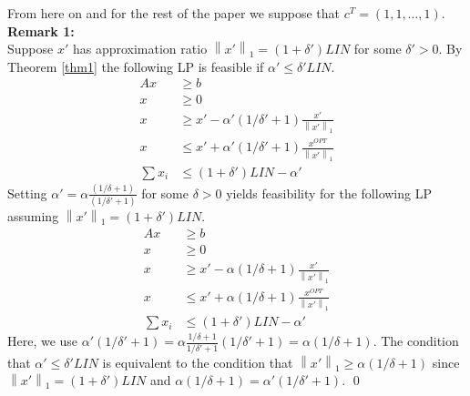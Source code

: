 \documentclass[a4paper,11pt]{article}
\newcommand{\nor}[1]{\left\|#1\right\|}
\begin{document}
From here on and for the rest of the paper we suppose that $c^T = (1,1, \ldots ,1)$.\\
{\bf Remark 1:\\}
Suppose $x'$ has approximation ratio $\nor{x'}_1 = (1+\delta') \mathit{LIN}$ for some $\delta' > 0$.
By Theorem \ref{thm1} the following LP is feasible if $\alpha' \leq \delta' \mathit{LIN}$.
\begin{align*}
      Ax &\geq b\\
      x &\geq 0\\
      x &\geq x' - \alpha'(1/\delta' +1) \frac{x'}{\nor{x'}_1}\\
      x &\leq x' + \alpha'(1/\delta' +1) \frac{x^{\mathit{OPT}}}{\nor{x'}_1}\\
      \sum x_i &\leq (1+ \delta') \mathit{LIN} - \alpha'
\end{align*}
Setting $\alpha' = \alpha \frac{(1/\delta+1)}{(1/\delta'+1)}$ for some $\delta >0$ yields feasibility for the following
LP assuming $\nor{x'}_1 = (1+ \delta')\mathit{LIN}$.
\begin{align*}
		\label{form:lpr}
    \tag{LP *}
      Ax &\geq b\\
      x &\geq 0\\
      x &\geq x' - \alpha(1/\delta+1) \frac{x'}{\nor{x'}_1}\\
      x &\leq x' + \alpha(1/\delta +1) \frac{x^{\mathit{OPT}}}{\nor{x'}_1}\\
      \sum x_i &\leq (1+ \delta') \mathit{LIN} - \alpha'
\end{align*}
Here, we use $\alpha' (1/\delta'+1)= \alpha \frac{1/\delta+1}{1/\delta'+1} (1/\delta'+1)
= \alpha(1/\delta +1)$. The condition that $\alpha' \leq \delta' \mathit{LIN}$ is equivalent to the condition that
$\nor{x'}_1 \geq \alpha (1/\delta +1)$ since $\nor{x'}_1 = (1+ \delta')\mathit{LIN}$ and $\alpha (1/\delta +1) =
\alpha' (1/ \delta' +1)$. \qed
\end{document}
